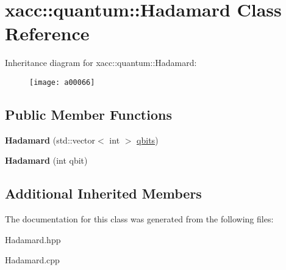 \hypertarget{a00066}{}\section{xacc\+:\+:quantum\+:\+:Hadamard Class Reference}
\label{a00066}
Inheritance diagram for xacc\+:\+:quantum\+:\+:Hadamard\+:\begin{figure}[H]
\begin{center}
\leavevmode
\texttt{[image: a00066]}
\end{center}
\end{figure}
\subsection*{Public Member Functions}
\begin{DoxyCompactItemize}
\item 
{\bfseries Hadamard} (std\+::vector$<$ int $>$ \hyperlink{a00062_a2a56be6c2519ea65df4d06f4abae1393}{qbits})\hypertarget{a00066_a1f26925eeb4a52ca7e52dd9158fe7005}{}\label{a00066_a1f26925eeb4a52ca7e52dd9158fe7005}

\item 
{\bfseries Hadamard} (int qbit)\hypertarget{a00066_aac4e06aae35583bcce39b6b178948364}{}\label{a00066_aac4e06aae35583bcce39b6b178948364}

\end{DoxyCompactItemize}
\subsection*{Additional Inherited Members}


The documentation for this class was generated from the following files\+:\begin{DoxyCompactItemize}
\item 
Hadamard.\+hpp\item 
Hadamard.\+cpp\end{DoxyCompactItemize}
